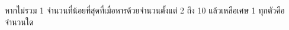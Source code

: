 ﻿%
\question หากไม่รวม 1 จำนวนที่น้อยที่สุดที่เมื่อหารด้วยจำนวนตั้งแต่ 2 ถึง 10 แล้วเหลือเศษ 1 ทุกตัวคือจำนวนใด
\newline
{}
